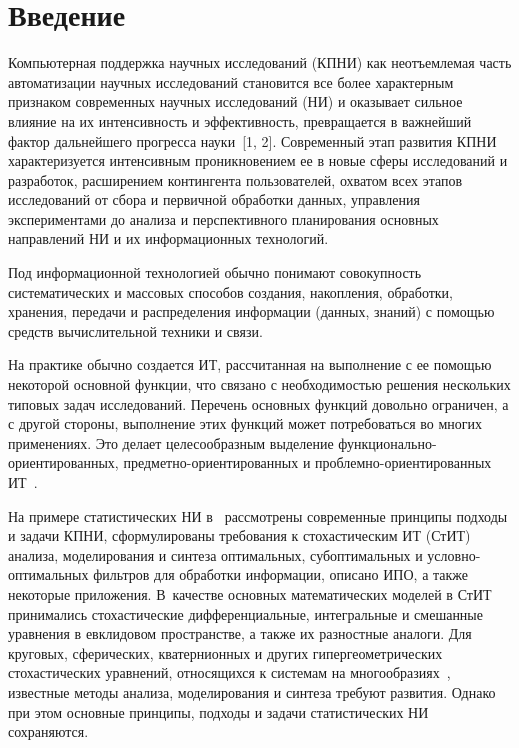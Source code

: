       \begin{multicols}{2}
      
            \label{st\stat}


\section{Введение}
Компьютерная поддержка научных исследований (КПНИ) как
 неотъемлемая часть автоматизации научных исследований
 становится все более характерным признаком современных научных
 исследований (НИ) и оказывает сильное влияние на их интенсивность и
 эффективность, превращается в важнейший фактор дальнейшего
 прогресса науки~[1, 2]. Современный этап развития КПНИ характеризуется  интенсивным
проникновением ее в новые сферы исследований и разработок,
расширением контингента пользователей, охватом всех
этапов исследований от сбора и первичной обработки данных,
управления экспериментами до анализа и перспективного планирования
основных на\-прав\-ле\-ний НИ и их информационных
технологий.

Под информационной технологией обычно понимают совокупность
систематических и массовых способов создания, накопления, обработки,
хранения, передачи и распределения информации (данных, знаний) с
помощью средств вычислительной техники и связи.

 На
практике обычно создается ИТ, рассчитанная на выполнение с ее
по\-мощью некоторой основной функции, что связано с необходимостью
решения нескольких типовых задач исследований.
Перечень основных функций довольно ограничен, а с другой стороны,
выполнение этих функций может потребоваться во многих применениях.
Это делает целесообразным выделение функ\-ци\-о\-наль\-но-ориен\-ти\-ро\-ван\-ных,
предметно-ориентированных и проб\-лем\-но-ориен\-ти\-ро\-ван\-ных ИТ~\cite{1-sin}.

 На примере статистических НИ в~\cite{1-sin} 
 рас\-смот\-ре\-ны современные принципы подходы и задачи КПНИ, сформулированы 
 требования к стохастическим ИТ (СтИТ) анализа, моделирования и синтеза 
 оптимальных, субоптимальных и услов\-но-оп\-ти\-маль\-ных фильтров для обработки 
 информации, описано ИПО, а 
 также некоторые приложения. В~качестве основных математических моделей в 
 СтИТ принимались стохастические дифференциальные, интегральные и смешанные 
 уравнения в евклидовом пространстве, а также их разностные аналоги. Для 
 круговых, сферических, кватернионных и других гипергеометрических 
 стохастических уравнений, относящихся к системам на многообразиях~\cite{3-sin}, 
 известные методы анализа, моделирования и синтеза требуют развития. Однако при 
 этом основные принципы, подходы и задачи статистических НИ сохраняются.


\end{multicols}
